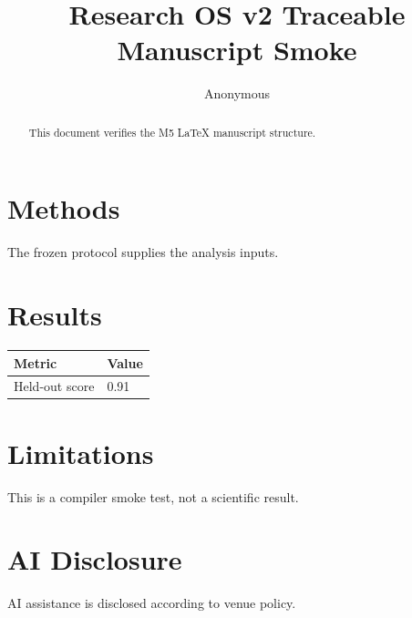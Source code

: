 \documentclass{article}
\begin{document}
\title{Research OS v2 Traceable Manuscript Smoke}
\author{Anonymous}
\maketitle
\begin{abstract}
This document verifies the M5 LaTeX manuscript structure.
\end{abstract}
\section{Methods}
The frozen protocol supplies the analysis inputs.
\section{Results}
\begin{tabular}{ll}
\toprule Metric & Value \\
\midrule Held-out score & 0.91 \\
\bottomrule
\end{tabular}
\section{Limitations}
This is a compiler smoke test, not a scientific result.
\section{AI Disclosure}
AI assistance is disclosed according to venue policy.
\end{document}
